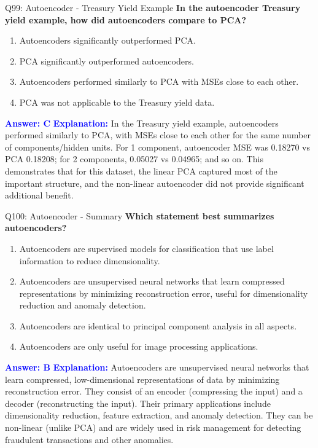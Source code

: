 \documentclass[8pt]{beamer}
\begin{document}
	\begin{frame}{Q99: Autoencoder - Treasury Yield Example}
		\fontsize{6.5}{7.5}\selectfont
		\textbf{In the autoencoder Treasury yield example, how did autoencoders compare to PCA?}
		\begin{enumerate}
			\item Autoencoders significantly outperformed PCA.
			\item PCA significantly outperformed autoencoders.
			\item Autoencoders performed similarly to PCA with MSEs close to each other.
			\item PCA was not applicable to the Treasury yield data.
		\end{enumerate}
		\vspace{0.1cm}
		\textcolor{blue}{\textbf{Answer: C}}
		\vspace{0.1cm}
		\textcolor{blue}{\textbf{Explanation:}} In the Treasury yield example, autoencoders performed similarly to PCA, with MSEs close to each other for the same number of components/hidden units. For 1 component, autoencoder MSE was 0.18270 vs PCA 0.18208; for 2 components, 0.05027 vs 0.04965; and so on. This demonstrates that for this dataset, the linear PCA captured most of the important structure, and the non-linear autoencoder did not provide significant additional benefit.
	\end{frame}
	
	\begin{frame}{Q100: Autoencoder - Summary}
		\fontsize{6.5}{7.5}\selectfont
		\textbf{Which statement best summarizes autoencoders?}
		\begin{enumerate}
			\item Autoencoders are supervised models for classification that use label information to reduce dimensionality.
			\item Autoencoders are unsupervised neural networks that learn compressed representations by minimizing reconstruction error, useful for dimensionality reduction and anomaly detection.
			\item Autoencoders are identical to principal component analysis in all aspects.
			\item Autoencoders are only useful for image processing applications.
		\end{enumerate}
		\vspace{0.1cm}
		\textcolor{blue}{\textbf{Answer: B}}
		\vspace{0.1cm}
		\textcolor{blue}{\textbf{Explanation:}} Autoencoders are unsupervised neural networks that learn compressed, low-dimensional representations of data by minimizing reconstruction error. They consist of an encoder (compressing the input) and a decoder (reconstructing the input). Their primary applications include dimensionality reduction, feature extraction, and anomaly detection. They can be non-linear (unlike PCA) and are widely used in risk management for detecting fraudulent transactions and other anomalies.
	\end{frame}
	
\end{document}
